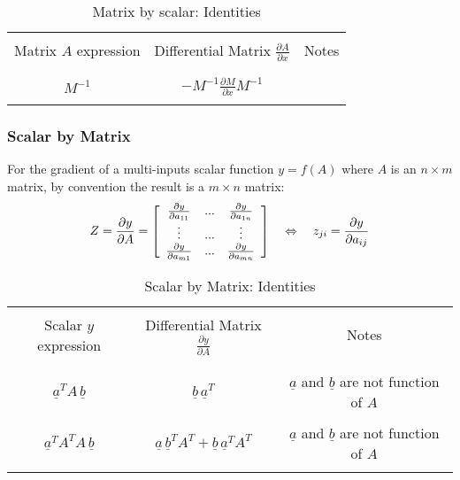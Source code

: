 \begin{table}[H]
\centering
\caption{ Matrix by scalar: Identities}
\label{scavec}
 \begin{tabular}{ | c | c | c |}
 \hline \hline & & \\
 Matrix $A$ expression & Differential Matrix $\frac{\partial A}{\partial x}$  & Notes \\ & & \\
 \hline \hline & & \\
 $ M^{-1} $ & 
 $ -M^{-1} \frac{\partial M}{\partial x} M^{-1} $ &   
 \\ & & \\
 \hline
 \end{tabular}
\end{table}



\subsubsection{Scalar by Matrix}

For the gradient of a multi-inputs scalar function $y = f( A )$ where $A$ is an $n \times m$ matrix, by convention the result is a $m \times n$ matrix:
\begin{align}
Z = \frac{\partial y}{\partial A} =  
\left[ \begin{array}{c c c } 
  \frac{\partial y}{\partial a_{11}}   & ... & \frac{\partial y}{\partial a_{1n}} \\
  \vdots                             & ... & \vdots                          \\
  \frac{\partial y}{\partial a_{m1}}   & ... & \frac{\partial y}{\partial a_{mn}} \\
 \end{array} \right]
 \quad\Leftrightarrow\quad
 z_{ji} = \frac{\partial y}{\partial a_{ij}}
\end{align}

\begin{table}[H]
\centering
\caption{ Scalar by Matrix: Identities}
\label{scavec}
 \begin{tabular}{ | c | c | c |}
 \hline \hline & & \\
 Scalar $y$ expression & Differential Matrix $\frac{\partial y}{\partial A}$  & Notes \\ & & \\
 \hline \hline & & \\
 $ \underline{a}^T A \, \underline{b} $ & 
 $ \underline{b} \, \underline{a}^T   $ &    $\underline{a}$ and  $\underline{b}$ are not function of $A$
 \\ & & \\
 $ \underline{a}^T A^T A \, \underline{b} $ & 
 $ \underline{a} \, \underline{b}^T A^T + \underline{b} \, \underline{a}^T  A^T  $ &    $\underline{a}$ and  $\underline{b}$ are not function of $A$
 \\ & & \\
 \hline
 \end{tabular}
\end{table}

